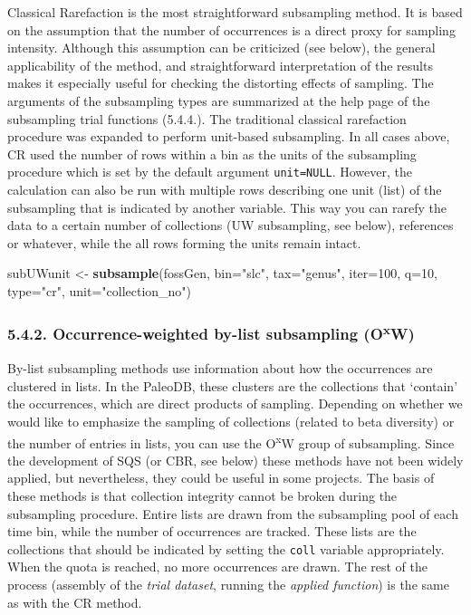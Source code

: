 \documentclass[]{article}
\newenvironment{Shaded}{\begin{snugshade}}{\end{snugshade}}
\newcommand{\KeywordTok}[1]{\textcolor[rgb]{0.13,0.29,0.53}{\textbf{{#1}}}}
\newcommand{\DataTypeTok}[1]{\textcolor[rgb]{0.13,0.29,0.53}{{#1}}}
\newcommand{\DecValTok}[1]{\textcolor[rgb]{0.00,0.00,0.81}{{#1}}}
\newcommand{\StringTok}[1]{\textcolor[rgb]{0.31,0.60,0.02}{{#1}}}
\newcommand{\NormalTok}[1]{{#1}}
\begin{document}
Classical Rarefaction is the most straightforward subsampling method. It
is based on the assumption that the number of occurrences is a direct
proxy for sampling intensity. Although this assumption can be criticized
(see below), the general applicability of the method, and
straightforward interpretation of the results makes it especially useful
for checking the distorting effects of sampling. The arguments of the
subsampling types are summarized at the help page of the subsampling
trial functions (5.4.4.). The traditional classical rarefaction
procedure was expanded to perform unit-based subsampling. In all cases
above, CR used the number of rows within a bin as the units of the
subsampling procedure which is set by the default argument
\texttt{unit=NULL}. However, the calculation can also be run with
multiple rows describing one unit (list) of the subsampling that is
indicated by another variable. This way you can rarefy the data to a
certain number of collections (UW subsampling, see below), references or
whatever, while the all rows forming the units remain intact.

\begin{Shaded}
\begin{Highlighting}[]
\NormalTok{subUWunit <-}\StringTok{ }\KeywordTok{subsample}\NormalTok{(fossGen, }\DataTypeTok{bin=}\StringTok{"slc"}\NormalTok{, }\DataTypeTok{tax=}\StringTok{"genus"}\NormalTok{, }
  \DataTypeTok{iter=}\DecValTok{100}\NormalTok{, }\DataTypeTok{q=}\DecValTok{10}\NormalTok{, }\DataTypeTok{type=}\StringTok{"cr"}\NormalTok{, }\DataTypeTok{unit=}\StringTok{"collection_no"}\NormalTok{)}
\end{Highlighting}
\end{Shaded}

\subsubsection{\texorpdfstring{5.4.2. Occurrence-weighted by-list
subsampling
(O\textsuperscript{x}W)}{5.4.2. Occurrence-weighted by-list subsampling (OxW)}}\label{occurrence-weighted-by-list-subsampling-oxw}

By-list subsampling methods use information about how the occurrences
are clustered in lists. In the PaleoDB, these clusters are the
collections that `contain' the occurrences, which are direct products of
sampling. Depending on whether we would like to emphasize the sampling
of collections (related to beta diversity) or the number of entries in
lists, you can use the O\textsuperscript{x}W group of subsampling. Since
the development of SQS (or CBR, see below) these methods have not been
widely applied, but nevertheless, they could be useful in some projects.
The basis of these methods is that collection integrity cannot be broken
during the subsampling procedure. Entire lists are drawn from the
subsampling pool of each time bin, while the number of occurrences are
tracked. These lists are the collections that should be indicated by
setting the \texttt{coll} variable appropriately. When the quota is
reached, no more occurrences are drawn. The rest of the process
(assembly of the \emph{trial dataset}, running the \emph{applied
function}) is the same as with the CR method.
\end{document}
